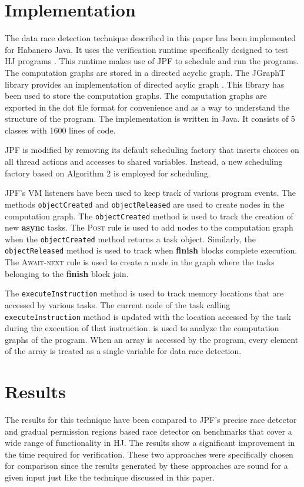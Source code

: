 \section{Implementation}
The data race detection technique described in this paper has been implemented for Habanero Java. It uses the verification runtime specifically designed to test HJ programs \cite{anderson2014jpf}. This runtime makes use of JPF to schedule and run the programs. The computation graphs are stored in a directed acyclic graph. The JGraphT library provides an implementation of directed acylic graph \cite{jgrapht}. This library has been used to store the computation graphs. The computation graphs are exported in the dot file format for convenience and as a way to understand the structure of the program. The implementation is written in Java. It consists of 5 classes with 1600 lines of code.

JPF is modified by removing its default scheduling factory that inserts choices on all thread actions and accesses to shared variables. Instead, a new scheduling factory based on Algorithm 2 is employed for scheduling.

JPF's VM listeners have been used to keep track of various program events. The methods \texttt{objectCreated} and \texttt{objectReleased} are used to create nodes in the computation graph. The \texttt{objectCreated} method is used to track the creation of new \textbf{async} tasks. The \textsc{Post} rule is used to add nodes to the computation graph when the \texttt{objectCreated} method returns a task object. Similarly, the \texttt{objectReleased} method is used to track when \textbf{finish} blocks complete execution. The \textsc{Await-next} rule is used to create a node in the graph where the tasks belonging to the \textbf{finish} block join.

The \texttt{executeInstruction} method is used to track memory locations that are accessed by various tasks. The current node of the task calling \texttt{executeInstruction} method is updated with the location accessed by the task during the execution of that instruction.  is used to analyze the computation graphs of the program. When an array is accessed by the program, every element of the array is treated as a single variable for data race detection.

\section{Results}
The results for this technique have been compared to JPF's precise race detector and gradual permission regions based race detector on benchmarks that cover a wide range of functionality in HJ. The results show a significant improvement in the time required for verification. These two approaches were specifically chosen for comparison since the results generated by these approaches are sound for a given input just like the technique discussed in this paper.

